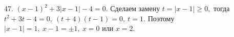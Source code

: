 47. $(x-1)^2+3|x-1|-4=0.$ Сделаем замену $t=|x-1|\geqslant0,$ тогда $t^2+3t-4=0,\ (t+4)(t-1)=0,\ t=1.$ Поэтому $|x-1|=1,\ x-1=\pm1,\ x=0$ или $x=2.$\\
